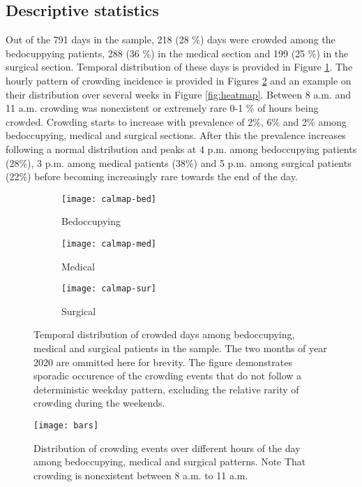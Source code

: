 \subsection{Descriptive statistics}

Out of the 791 days in the sample, 218 (28 \%) days were crowded among the bedocuppying patients, 288 (36 \%) in the medical section and 199 (25 \%) in the surgical section. Temporal distribution of these days is provided in Figure \ref{fig:calmap}. The hourly pattern of crowding incidence is provided in Figures \ref{fig:bars} and an example on their distribution over several weeks in Figure \ref{fig:heatmap}. Between 8 a.m. and 11 a.m. crowding was nonexistent or extremely rare 0-1 \% of hours being crowded. Crowding starts to increase with prevalence of 2\%, 6\% and 2\% among bedoccupying, medical and surgical sections. After this the prevalence increases following a normal distribution and peaks at 4 p.m. among bedoccupying patients (28\%), 3 p.m. among medical patients (38\%) and 5 p.m. among surgical patients (22\%) before becoming increasingly rare towards the end of the day.

\begin{figure}[p]
    \centering
        \begin{subfigure}[b]{1\textwidth}
            \texttt{[image: calmap-bed]}
            \caption{Bedoccupying}
        \end{subfigure}
        \begin{subfigure}[b]{1\textwidth}
            \texttt{[image: calmap-med]}
            \caption{Medical}
        \end{subfigure}
        \begin{subfigure}[b]{1\textwidth}
            \texttt{[image: calmap-sur]}
            \caption{Surgical}
        \end{subfigure}
        \caption{Temporal distribution of crowded days among bedoccupying, medical and surgical patients in the sample. The two months of year 2020 are ommitted here for brevity. The figure demonstrates sporadic occurence of the crowding events that do not follow a deterministic weekday pattern, excluding the relative rarity of crowding during the weekends.}
        \label{fig:calmap}
\end{figure}




\begin{figure}[H]
    \centering  
    \texttt{[image: bars]}
    \caption{Distribution of crowding events over different hours of the day among bedoccupying, medical and surgical patterns. Note That crowding is nonexistent between 8 a.m. to 11 a.m.}
    \label{fig:bars}
\end{figure}

